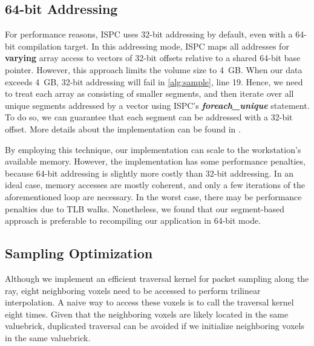 \subsection{64-bit Addressing} 
For performance reasons, ISPC uses 32-bit addressing by default, even with
a 64-bit compilation target. In this addressing mode, ISPC maps all addresses for
\textbf{varying} array access to vectors of 32-bit offsets relative to a shared
64-bit base pointer. However, this approach limits the volume size to 4~GB.
When our data exceeds 4~GB, 32-bit addressing will fail in \cref{alg:sample},
line 19. Hence, we need to treat each array as consisting of smaller
segments, and then iterate over all unique segments addressed by a vector using
ISPC's \textbf{\textit{foreach\_unique}} statement. To do so, we can guarantee 
that each segment can be addressed with a 32-bit offset. More details about
the implementation can be found in \cite{wald_2018}. 

By employing this technique, our implementation can scale to the workstation's available
memory. However, the implementation has some performance penalties, because 64-bit addressing is slightly
more costly than 32-bit addressing. In an ideal case, memory accesses are mostly coherent, and only a few iterations of the aforementioned loop are necessary. In the worst case, 
there may be performance penalties due to TLB walks. Nonetheless, we found that our
segment-based approach is preferable to recompiling our application in 64-bit mode. 


\subsection{Sampling Optimization}
Although we implement an efficient traversal kernel for packet sampling along the ray,
eight neighboring voxels need to be accessed to perform trilinear interpolation.
A naive way to access these voxels is to call the traversal kernel eight
times. Given that the neighboring voxels are likely located in the same valuebrick,
duplicated traversal can be avoided if we initialize neighboring voxels in the same
valuebrick. 

